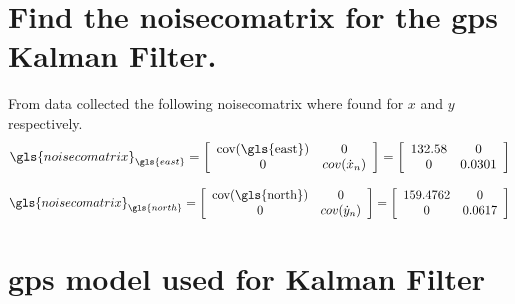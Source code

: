 \newpage
 \tocless\section{Find the \gls{noisecomatrix} for the \gls{gps} Kalman Filter.}
From data collected the following \gls{noisecomatrix} where found for $x$ and $y$ respectively.
					\begin{equation}
					\gls{noisecomatrix}_{\gls{east}} = 		
					\left[\begin{array}{cc}
					\mathrm{cov(\gls{east})}       &                 0                          \\ 
					0                                                          & cov( \dot{x}_n   )          
					\end{array} \right]
					=					
					\left[\begin{array}{cc}
				 132.58    &                 0                          \\ 
					0                                                          & 0.0301         
					\end{array} \right]
					\end{equation}
					
										\begin{equation}
										\gls{noisecomatrix}_{\gls{north}} = 		
										\left[\begin{array}{cc}
										\mathrm{cov(\gls{north})}       &                 0                          \\ 
										0                                                          & cov( \dot{y}_n   )          
										\end{array} \right]
										=					
										\left[\begin{array}{cc}
										159.4762    &                 0                          \\ 
										0                                                          & 0.0617         
										\end{array} \right]
										\end{equation}
										
	 \tocless\section{\gls{gps} model used for Kalman Filter}			
	
